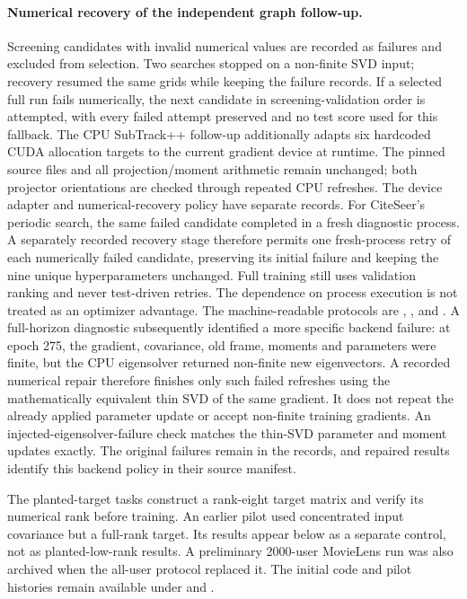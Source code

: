 \paragraph{Numerical recovery of the independent graph follow-up.}
\label{app:numerical-recovery}
Screening candidates with invalid numerical values are recorded as failures
and excluded from selection. Two searches stopped on a non-finite SVD input;
recovery resumed the same grids while keeping the failure records. If a selected full run fails
numerically, the next candidate in screening-validation order is attempted,
with every failed attempt preserved and no test score used for this fallback.
The CPU SubTrack++ follow-up additionally adapts six hardcoded CUDA allocation
targets to the current gradient device at runtime. The pinned source files and
all projection/moment arithmetic remain unchanged; both projector orientations
are checked through repeated CPU refreshes. The device adapter and numerical-recovery policy have separate records.
For CiteSeer's periodic search, the same failed candidate completed in a fresh
diagnostic process. A separately recorded recovery stage therefore permits
one fresh-process retry of each numerically failed candidate, preserving its
initial failure and keeping the nine unique hyperparameters unchanged. Full
training still uses validation ranking and never test-driven retries. The dependence on process execution is not treated as an optimizer advantage. The machine-readable protocols are
,
, and
.
A full-horizon diagnostic subsequently identified a more specific backend
failure: at epoch 275, the gradient, covariance, old frame, moments and
parameters were finite, but the CPU eigensolver returned non-finite new
eigenvectors. A recorded numerical repair therefore finishes only such
failed refreshes using the mathematically equivalent thin SVD of the same
gradient. It does not repeat the already applied parameter update or accept
non-finite training gradients. An injected-eigensolver-failure check matches
the thin-SVD parameter and moment updates exactly. The original failures remain in the records, and repaired results identify
this backend policy in their source manifest.


The planted-target tasks construct a rank-eight target matrix and verify
its numerical rank before training. An earlier pilot used concentrated
input covariance but a full-rank target. Its results appear below as a
separate control, not as planted-low-rank results. A preliminary 2000-user
MovieLens run was also archived when the all-user protocol replaced it.
The initial code and pilot histories remain available under
 and
.



